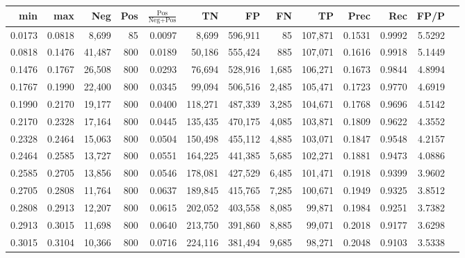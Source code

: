 \begin{tabular}{rrrrrrrrrrrrr}
\toprule
   min &    max &    Neg &   Pos & $\frac{\text{Pos}}{\text{Neg}+\text{Pos}}$ &      TN &      FP &      FN &      TP &   Prec &    Rec &   FP/P \\
\midrule
0.0173 & 0.0818 &  8,699 &    85 &                                     0.0097 &   8,699 & 596,911 &      85 & 107,871 & 0.1531 & 0.9992 & 5.5292 \\
0.0818 & 0.1476 & 41,487 &   800 &                                     0.0189 &  50,186 & 555,424 &     885 & 107,071 & 0.1616 & 0.9918 & 5.1449 \\
0.1476 & 0.1767 & 26,508 &   800 &                                     0.0293 &  76,694 & 528,916 &   1,685 & 106,271 & 0.1673 & 0.9844 & 4.8994 \\
0.1767 & 0.1990 & 22,400 &   800 &                                     0.0345 &  99,094 & 506,516 &   2,485 & 105,471 & 0.1723 & 0.9770 & 4.6919 \\
0.1990 & 0.2170 & 19,177 &   800 &                                     0.0400 & 118,271 & 487,339 &   3,285 & 104,671 & 0.1768 & 0.9696 & 4.5142 \\
0.2170 & 0.2328 & 17,164 &   800 &                                     0.0445 & 135,435 & 470,175 &   4,085 & 103,871 & 0.1809 & 0.9622 & 4.3552 \\
0.2328 & 0.2464 & 15,063 &   800 &                                     0.0504 & 150,498 & 455,112 &   4,885 & 103,071 & 0.1847 & 0.9548 & 4.2157 \\
0.2464 & 0.2585 & 13,727 &   800 &                                     0.0551 & 164,225 & 441,385 &   5,685 & 102,271 & 0.1881 & 0.9473 & 4.0886 \\
0.2585 & 0.2705 & 13,856 &   800 &                                     0.0546 & 178,081 & 427,529 &   6,485 & 101,471 & 0.1918 & 0.9399 & 3.9602 \\
0.2705 & 0.2808 & 11,764 &   800 &                                     0.0637 & 189,845 & 415,765 &   7,285 & 100,671 & 0.1949 & 0.9325 & 3.8512 \\
0.2808 & 0.2913 & 12,207 &   800 &                                     0.0615 & 202,052 & 403,558 &   8,085 &  99,871 & 0.1984 & 0.9251 & 3.7382 \\
0.2913 & 0.3015 & 11,698 &   800 &                                     0.0640 & 213,750 & 391,860 &   8,885 &  99,071 & 0.2018 & 0.9177 & 3.6298 \\
0.3015 & 0.3104 & 10,366 &   800 &                                     0.0716 & 224,116 & 381,494 &   9,685 &  98,271 & 0.2048 & 0.9103 & 3.5338 \\

\end{tabular}
